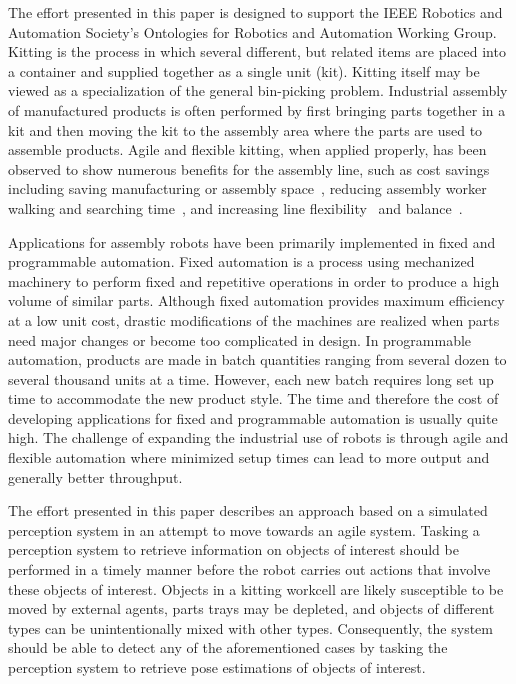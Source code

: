 The effort presented in this paper is designed to support the IEEE Robotics and Automation Society's Ontologies for Robotics and Automation Working Group. 
Kitting is the process in which several different, but related items are placed into a container and supplied together as a single unit (kit). 
Kitting itself may be viewed as a specialization of the general bin-picking problem. Industrial assembly of manufactured products is often performed by first 
bringing parts together in a kit and then moving the kit to the assembly area where the parts are used to assemble products. Agile and flexible kitting, when 
applied properly, has been observed to show numerous benefits for the assembly line, such as cost savings~\cite{Carlsson_2008} including saving manufacturing or 
assembly space~\cite{Medbo2003}, reducing assembly worker walking and searching time~\cite{Schwind1992}, and increasing line flexibility~\cite{Bozer1992} and 
balance~\cite{Jiao2000}.

Applications for assembly robots have been primarily implemented in fixed and programmable automation. Fixed automation is a process using mechanized machinery 
to perform fixed and repetitive operations in order to produce a high volume of similar parts. Although fixed automation provides maximum efficiency at a low unit 
cost, drastic modifications of the machines are realized when parts need major changes or become too complicated in design. In programmable automation, products 
are made in batch quantities ranging from several dozen to several thousand units at a time. However, each new batch requires long set up time to accommodate the 
new product style. The time and therefore the cost of developing applications for fixed and programmable automation is usually quite high. The challenge of expanding 
the industrial use of robots is through agile and flexible automation where minimized setup times can lead to more output and generally better throughput.

The effort presented in this paper describes an approach based on a simulated perception system in an attempt to move towards an agile system. Tasking a perception system 
to retrieve information on objects of interest should be performed in a timely manner before the robot carries out actions that involve these objects of interest. 
Objects in a kitting workcell are likely susceptible to be moved by external agents, parts trays may be depleted, and objects of different types can be 
unintentionally mixed with other types. Consequently, the system should be able to detect any of the aforementioned cases by tasking the perception system to 
retrieve pose estimations of objects of interest.

